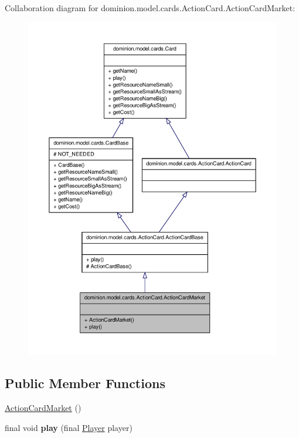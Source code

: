 \-Collaboration diagram for dominion.\-model.\-cards.\-Action\-Card.\-Action\-Card\-Market\-:
\nopagebreak
\begin{figure}[H]
\begin{center}
\leavevmode
\includegraphics[width=350pt]{classdominion_1_1model_1_1cards_1_1ActionCard_1_1ActionCardMarket__coll__graph}
\end{center}
\end{figure}
\subsection*{\-Public \-Member \-Functions}
\begin{DoxyCompactItemize}
\item 
\hyperlink{classdominion_1_1model_1_1cards_1_1ActionCard_1_1ActionCardMarket_a4d6deb0db7525d62d08f76222e28f22d}{\-Action\-Card\-Market} ()
\item 
\hypertarget{classdominion_1_1model_1_1cards_1_1ActionCard_1_1ActionCardMarket_a2438b59165001b713200d05864f3ed10}{final void {\bfseries play} (final \hyperlink{interfacedominion_1_1model_1_1Player}{\-Player} player)}\label{classdominion_1_1model_1_1cards_1_1ActionCard_1_1ActionCardMarket_a2438b59165001b713200d05864f3ed10}

\end{DoxyCompactItemize}


